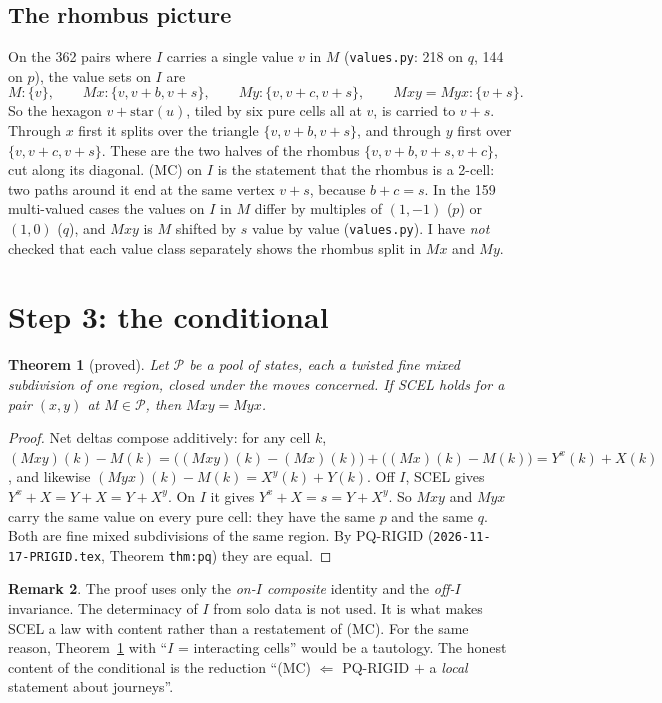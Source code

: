 \documentclass[11pt]{article}
\newtheorem{theorem}{Theorem}\newtheorem{lemma}[theorem]{Lemma}\newtheorem{conjecture}[theorem]{Conjecture}
\theoremstyle{definition}\newtheorem{definition}[theorem]{Definition}\newtheorem{remark}[theorem]{Remark}
\begin{document}
\subsection{The rhombus picture}
On the 362 pairs where $I$ carries a single value $v$ in $M$ (\texttt{values.py}: 218 on $q$, 144 on $p$), the value sets on $I$ are
\[M:\{v\},\qquad Mx:\{v,v+b,v+s\},\qquad My:\{v,v+c,v+s\},\qquad Mxy=Myx:\{v+s\}.\]
So the hexagon $v+\mathrm{star}(u)$, tiled by six pure cells all at $v$, is carried to $v+s$. Through $x$ first it splits over the triangle $\{v,v+b,v+s\}$, and
through $y$ first over $\{v,v+c,v+s\}$. These are the two halves of the rhombus $\{v,v+b,v+s,v+c\}$, cut along its diagonal. (MC) on $I$ is the statement that the
rhombus is a 2-cell: two paths around it end at the same vertex $v+s$, because $b+c=s$. In the 159 multi-valued cases the values on $I$ in $M$ differ by multiples of $(1,-1)$ ($p$) or $(1,0)$ ($q$), and $Mxy$ is $M$ shifted by $s$ value by value
(\texttt{values.py}). I have \emph{not} checked that each value class separately shows the rhombus split in $Mx$ and $My$.

\section{Step 3: the conditional}
\begin{theorem}[proved]\label{thm:cond}
Let $\mathcal P$ be a pool of states, each a twisted fine mixed subdivision of one region, closed under the moves concerned. If SCEL holds for a pair $(x,y)$ at $M\in\mathcal P$,
then $Mxy=Myx$.
\end{theorem}
\begin{proof}
Net deltas compose additively: for any cell $k$, $(Mxy)(k)-M(k)=\big((Mxy)(k)-(Mx)(k)\big)+\big((Mx)(k)-M(k)\big)=Y^x(k)+X(k)$, and likewise
$(Myx)(k)-M(k)=X^y(k)+Y(k)$. Off $I$, SCEL gives $Y^x+X=Y+X=Y+X^y$. On $I$ it gives $Y^x+X=s=Y+X^y$. So $Mxy$ and $Myx$ carry the same value on every pure cell:
they have the same $p$ and the same $q$. Both are fine mixed subdivisions of the same region. By PQ-RIGID (\texttt{2026-11-17-PRIGID.tex}, Theorem \texttt{thm:pq}) they are equal.
\end{proof}
\begin{remark}
The proof uses only the \emph{on-$I$ composite} identity and the \emph{off-$I$} invariance. The determinacy of $I$ from solo data is not used. It is what makes
SCEL a law with content rather than a restatement of (MC). For the same reason, Theorem~\ref{thm:cond} with ``$I$ = interacting cells'' would be a tautology.
The honest content of the conditional is the reduction ``(MC) $\Leftarrow$ PQ-RIGID $+$ a \emph{local} statement about journeys''.
\end{remark}
\end{document}
